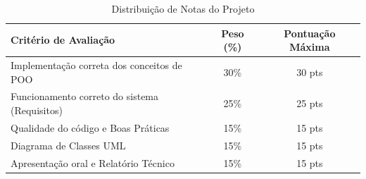 \documentclass[12pt,a4paper]{article}
\begin{document}
\begin{table}[htbp]
    \centering
    \caption{Distribuição de Notas do Projeto}
    \label{tab:pesos}
    \vspace{0.3cm}
    \begin{tabular}{lcc}
        \toprule
        \textbf{Critério de Avaliação} & \textbf{Peso (\%)} & \textbf{Pontuação Máxima} \\
        \midrule
        Implementação correta dos conceitos de POO & 30\% & 30 pts \\
        Funcionamento correto do sistema (Requisitos) & 25\% & 25 pts \\
        Qualidade do código e Boas Práticas & 15\% & 15 pts \\
        Diagrama de Classes UML & 15\% & 15 pts \\
        Apresentação oral e Relatório Técnico & 15\% & 15 pts \\
        \bottomrule
    \end{tabular}
\end{table}
\end{document}
